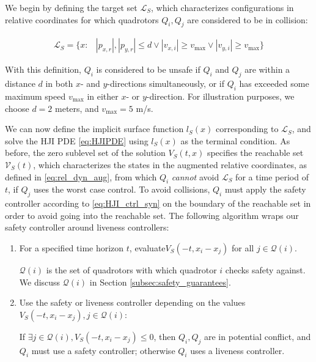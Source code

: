 We begin by defining the target set $\mathcal{L}_S$, which characterizes configurations in relative coordinates for which quadrotors $Q_i,Q_j$ are considered to be in collision:

\begin{equation}
\begin{aligned}
\mathcal{L}_S = \{x: &|p_{x,r}|, |p_{y,r}|\le d \vee |v_{x,i}| \ge v_\text{max} \vee |v_{y,i}| \ge v_\text{max} \}
\end{aligned}
\end{equation}

With this definition, $Q_i$ is considered to be unsafe if $Q_i$ and $Q_j$ are within a distance $d$ in both $x$- and $y$-directions simultaneously, or if $Q_i$ has exceeded some maximum speed $v_\text{max}$ in either $x$- or $y$-direction. For illustration purposes, we choose $d=2$ meters, and $v_\text{max}= 5$ m/s.

We can now define the implicit surface function $l_S(x)$ corresponding to $\mathcal{L}_S$, and solve the HJI PDE \eqref{eq:HJIPDE} using $l_S(x)$ as the terminal condition. As before, the zero sublevel set of the solution $V_S(t,x)$ specifies the reachable set $\mathcal{V}_S(t)$, which characterizes the states in the augmented relative coordinates, as defined in \eqref{eq:rel_dyn_aug}, from which $Q_i$ \textit{cannot} avoid $\mathcal{L}_S$ for a time period of $t$, if $Q_j$ uses the worst case control. To avoid collisions, $Q_i$ must apply the safety controller according to \eqref{eq:HJI_ctrl_syn} on the boundary of the reachable set in order to avoid going into the reachable set. The following algorithm wraps our safety controller around liveness controllers:

\begin{enumerate}
\item For a specified time horizon $t$, evaluate$V_S(-t,x_i-x_j)$ for all $j\in \mathcal{Q}(i)$.

$\mathcal{Q}(i)$ is the set of quadrotors with which quadrotor $i$ checks safety against. We discuss $\mathcal{Q}(i)$ in Section \ref{subsec:safety_guarantees}.

\item Use the safety or liveness controller depending on the values $V_S(-t,x_i-x_j),j\in \mathcal{Q}(i)$: 

If $\exists j\in \mathcal{Q}(i),V_S(-t,x_i-x_j)\le 0$, then $Q_i,Q_j$ are in potential conflict, and $Q_i$ must use a safety controller; otherwise $Q_i$ uses a liveness controller.
\end{enumerate}

